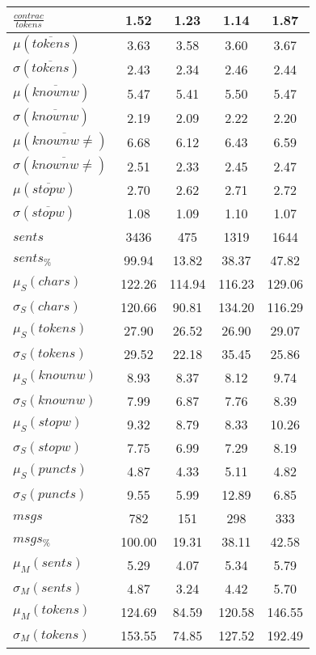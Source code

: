 \begin{table}[h!]
\begin{center}
\begin{tabular}{| l || c | c | c | c |}
$\frac{contrac}{tokens}$ & 1.52  & 1.23  & 1.14  & 1.87 \\\hline\hline
$\mu(\overline{tokens})$ & 3.63  & 3.58  & 3.60  & 3.67 \\
$\sigma(\overline{tokens})$ & 2.43  & 2.34  & 2.46  & 2.44 \\\hline
$\mu(\overline{knownw})$ & 5.47  & 5.41  & 5.50  & 5.47 \\
$\sigma(\overline{knownw})$ & 2.19  & 2.09  & 2.22  & 2.20 \\\hline
$\mu(\overline{knownw \neq})$ & 6.68  & 6.12  & 6.43  & 6.59 \\
$\sigma(\overline{knownw \neq})$ & 2.51  & 2.33  & 2.45  & 2.47 \\\hline
$\mu(\overline{stopw})$ & 2.70  & 2.62  & 2.71  & 2.72 \\
$\sigma(\overline{stopw})$ & 1.08  & 1.09  & 1.10  & 1.07 \\\hline\hline
$sents$ & 3436  & 475  & 1319  & 1644 \\
$sents_{\%}$ & 99.94  & 13.82  & 38.37  & 47.82 \\\hline
$\mu_S(chars)$ & 122.26  & 114.94  & 116.23  & 129.06 \\
$\sigma_S(chars)$ & 120.66  & 90.81  & 134.20  & 116.29 \\\hline
$\mu_S(tokens)$ & 27.90  & 26.52  & 26.90  & 29.07 \\
$\sigma_S(tokens)$ & 29.52  & 22.18  & 35.45  & 25.86 \\\hline
$\mu_S(knownw)$ & 8.93  & 8.37  & 8.12  & 9.74 \\
$\sigma_S(knownw)$ & 7.99  & 6.87  & 7.76  & 8.39 \\\hline
$\mu_S(stopw)$ & 9.32  & 8.79  & 8.33  & 10.26 \\
$\sigma_S(stopw)$ & 7.75  & 6.99  & 7.29  & 8.19 \\\hline
$\mu_S(puncts)$ & 4.87  & 4.33  & 5.11  & 4.82 \\
$\sigma_S(puncts)$ & 9.55  & 5.99  & 12.89  & 6.85 \\\hline\hline
$msgs$ & 782  & 151  & 298  & 333 \\
$msgs_{\%}$ & 100.00  & 19.31  & 38.11  & 42.58 \\\hline
$\mu_M(sents)$ & 5.29  & 4.07  & 5.34  & 5.79 \\
$\sigma_M(sents)$ & 4.87  & 3.24  & 4.42  & 5.70 \\\hline
$\mu_M(tokens)$ & 124.69  & 84.59  & 120.58  & 146.55 \\
$\sigma_M(tokens)$ & 153.55  & 74.85  & 127.52  & 192.49 \\\hline

\end{tabular}
\end{center}
\end{table}
